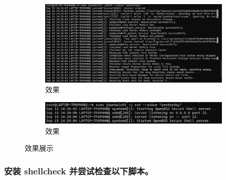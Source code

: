 \documentclass[UTF8]{ctexart}
\begin{document}
\begin{enumerate}
\begin{itemize}
 \begin{figure}[H]
    \centering
    \begin{subfigure}[b]{0.48\textwidth}
        \includegraphics[width=\textwidth]{113} %
        \caption{效果}
        \label{fig:left}
    \end{subfigure}
    \hfill
    \begin{subfigure}[b]{0.48\textwidth}
        \includegraphics[width=\textwidth]{114} %
        \caption{效果}
        \label{fig:right}
    \end{subfigure}
    \caption{效果展示}
    \label{fig:side_by_side}
\end{figure}
  \end{itemize}
\end{enumerate}

\subsubsection{安装 shellcheck 并尝试检查以下脚本。}
\end{document}
